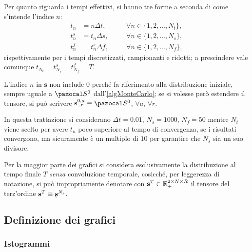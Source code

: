       Per quanto riguarda i tempi effettivi, si hanno tre forme a seconda di come s'intende l'indice \(n\):
      \begin{equation*}
        \newcommand\hsep{\hspace{1em}}
        \begin{aligned}
          t_n&=n\Delta t,&\hsep&\forall n\in\{1,2,\ldots,N_t\},\\
          t^s_n&=t_n\Delta s,&\hsep&\forall n\in\{1,2,\ldots,N_s\},\\
          t^f_n&=t^s_n\Delta f,&\hsep&\forall n\in\{1,2,\ldots,N_f\},
        \end{aligned}
      \end{equation*}
      rispettivamente per i tempi discretizzati, campionanti e ridotti; a prescindere vale comunque \(t_{N_t}=t^s_{N_s}=t^f_{N_f}=T\).

      \begin{oss}
        L'indice \(n\) in \(\mathbf s\) non include \(0\) perché fa riferimento alla distribuzione iniziale, sempre uguale a \(\pazocal S^0\) dall'\cref{algMonteCarlo}; se si volesse però estendere il tensore, si può scrivere \(\mathbf s^{0,a}_{\cdot,r}\equiv\pazocal S^0\), \(\forall a\), \(\forall r\).
      \end{oss}

      \begin{ipo}
        In questa trattazione si considerano \(\Delta t=0.01\), \(N_s=1000\), \(N_f=50\) mentre \(N_t\) viene scelto per avere \(t_n\) poco superiore al tempo di convergenza, se i risultati convergono, ma sicuramente è un multiplo di \(10\) per garantire che \(N_s\) sia un suo divisore.
      \end{ipo}

      \begin{oss}
        Per la maggior parte dei grafici si considera esclusivamente la distribuzione al tempo finale \(T\) \textit{senza} convoluzione temporale, cosicché, per leggerezza di notazione, si può impropriamente denotare con \(\mathbf s^T\in\mathbb R_+^{2\times N\times R}\) il tensore del terz'ordine \(\mathbf s^T\equiv\undertilde{\mathbf s}^{N_s}\).
      \end{oss}

    \subsection{Definizione dei grafici}\label{secDefinizioneGrafici}

      \subsubsection{Istogrammi}

